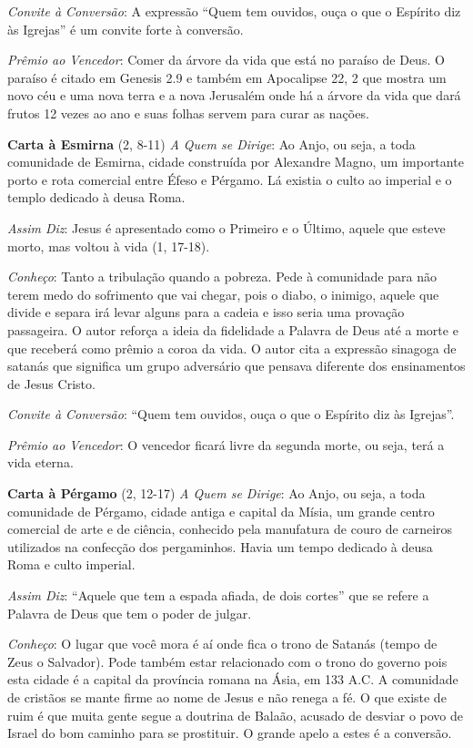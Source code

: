 \documentclass[
]{book}
\begin{document}
\emph{Convite à Conversão}: A expressão ``Quem tem ouvidos, ouça o que o Espírito diz às Igrejas'' é um convite forte à conversão.

\emph{Prêmio ao Vencedor}: Comer da árvore da vida que está no paraíso de Deus. O paraíso é citado em Genesis 2.9 e também em Apocalipse 22, 2 que mostra um novo céu e uma nova terra e a nova Jerusalém onde há a árvore da vida que dará frutos 12 vezes ao ano e suas folhas servem para curar as nações.

\textbf{Carta à Esmirna} (2, 8-11)
\emph{A Quem se Dirige}: Ao Anjo, ou seja, a toda comunidade de Esmirna, cidade construída por Alexandre Magno, um importante porto e rota comercial entre Éfeso e Pérgamo. Lá existia o culto ao imperial e o templo dedicado à deusa Roma.

\emph{Assim Diz}: Jesus é apresentado como o Primeiro e o Último, aquele que esteve morto, mas voltou à vida (1, 17-18).

\emph{Conheço}: Tanto a tribulação quando a pobreza. Pede à comunidade para não terem medo do sofrimento que vai chegar, pois o diabo, o inimigo, aquele que divide e separa irá levar alguns para a cadeia e isso seria uma provação passageira. O autor reforça a ideia da fidelidade a Palavra de Deus até a morte e que receberá como prêmio a coroa da vida. O autor cita a expressão sinagoga de satanás que significa um grupo adversário que pensava diferente dos ensinamentos de Jesus Cristo.

\emph{Convite à Conversão}: ``Quem tem ouvidos, ouça o que o Espírito diz às Igrejas''.

\emph{Prêmio ao Vencedor}: O vencedor ficará livre da segunda morte, ou seja, terá a vida eterna.

\textbf{Carta à Pérgamo} (2, 12-17)
\emph{A Quem se Dirige}: Ao Anjo, ou seja, a toda comunidade de Pérgamo, cidade antiga e capital da Mísia, um grande centro comercial de arte e de ciência, conhecido pela manufatura de couro de carneiros utilizados na confecção dos pergaminhos. Havia um tempo dedicado à deusa Roma e culto imperial.

\emph{Assim Diz}: ``Aquele que tem a espada afiada, de dois cortes'' que se refere a Palavra de Deus que tem o poder de julgar.

\emph{Conheço}: O lugar que você mora é aí onde fica o trono de Satanás (tempo de Zeus o Salvador). Pode também estar relacionado com o trono do governo pois esta cidade é a capital da província romana na Ásia, em 133 A.C. A comunidade de cristãos se mante firme ao nome de Jesus e não renega a fé.
O que existe de ruim é que muita gente segue a doutrina de Balaão, acusado de desviar o povo de Israel do bom caminho para se prostituir. O grande apelo a estes é a conversão.
\end{document}
